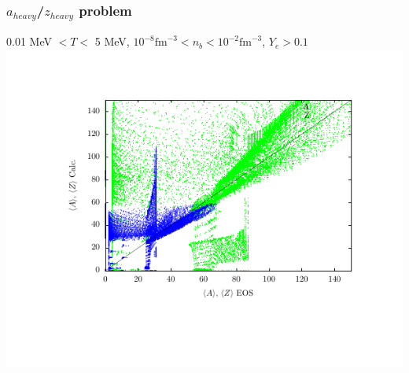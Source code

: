 \documentclass{beamer}
\begin{document}
\begin{frame}
\frametitle{$a_{heavy}$/$z_{heavy}$ problem}
0.01 MeV $< T <$ 5 MeV,  $10^{-8} \textrm{fm}^{-3} < n_b < 10^{-2} \textrm{fm}^{-3}$, $Y_e > 0.1$
\vspace{-3em}
\includegraphics[width=1.1\textwidth]{plots/abundances.pdf}
\end{frame}
\end{document}
